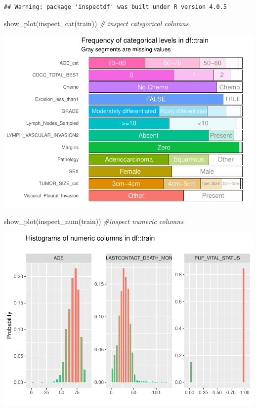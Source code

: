 \documentclass[
  11pt,
]{article}
\newenvironment{Shaded}{\begin{snugshade}}{\end{snugshade}}
\newcommand{\CommentTok}[1]{\textcolor[rgb]{0.56,0.35,0.01}{\textit{#1}}}
\newcommand{\FunctionTok}[1]{\textcolor[rgb]{0.00,0.00,0.00}{#1}}
\newcommand{\NormalTok}[1]{#1}
\begin{document}
\begin{verbatim}
## Warning: package 'inspectdf' was built under R version 4.0.5
\end{verbatim}

\begin{Shaded}
\begin{Highlighting}[]
\FunctionTok{show\_plot}\NormalTok{(}\FunctionTok{inspect\_cat}\NormalTok{(train)) }\CommentTok{\# inspect categorical columns }
\end{Highlighting}
\end{Shaded}

\includegraphics{Hazard_and_Risk_plot_updated_files/figure-latex/unnamed-chunk-10-1.pdf}

\begin{Shaded}
\begin{Highlighting}[]
\FunctionTok{show\_plot}\NormalTok{(}\FunctionTok{inspect\_num}\NormalTok{(train)) }\CommentTok{\#inspect numeric columns }
\end{Highlighting}
\end{Shaded}

\includegraphics{Hazard_and_Risk_plot_updated_files/figure-latex/unnamed-chunk-10-2.pdf}
\end{document}
